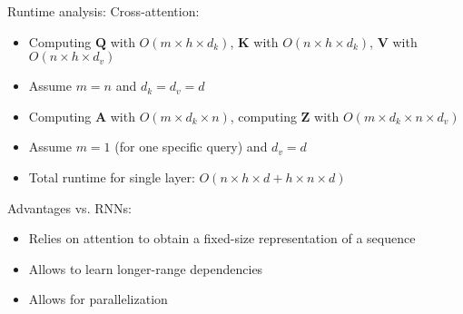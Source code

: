 Runtime analysis: Cross-attention:
\begin{itemize}
    \item Computing $\boldsymbol{Q}$ with $O(m \times h \times d_k)$, $\boldsymbol{K}$ with $O(n \times h \times d_k)$, $\boldsymbol{V}$ with $O(n \times h \times d_v)$
    \item Assume $m = n$ and $d_k = d_v = d$
     \item Computing $\boldsymbol{A}$ with $O(m \times d_k \times n)$, computing $\boldsymbol{Z}$ with $O(m \times d_k \times n \times d_v)$
     \item Assume $m = 1$ (for one specific query) and $d_v = d$
     \item Total runtime for single layer: $O(n \times h \times d + h \times n \times d)$
\end{itemize}
Advantages vs. RNNs:
\begin{itemize}
    \item Relies on attention to obtain a fixed-size representation of a sequence
    \item Allows to learn longer-range dependencies 
    \item Allows for parallelization 
\end{itemize}

